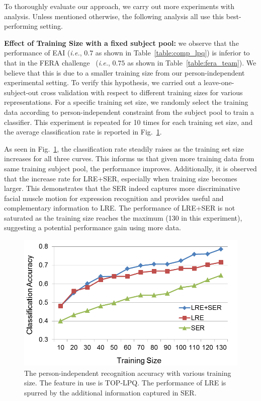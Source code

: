 \documentclass[journal]{IEEEtran}
\begin{document}
To thoroughly evaluate our approach, we carry out more experiments with analysis. Unless mentioned otherwise, the following analysis all use this best-performing setting. 

\textbf{Effect of Training Size with a fixed subject pool:} we observe that the performance of EAI (\textit{i.e.}, $0.7$ as shown in Table~\ref{table:comp_lpq}) is inferior to that in the FERA challenge~\cite{Yang_SMCB12} (\textit{i.e.}, $0.75$ as shown in Table~\ref{table:fera_team}). We believe that this is due to a smaller training size from our person-independent experimental setting. To verify this hypothesis, we carried out a leave-one-subject-out cross validation with respect to different training sizes for various representations. For a specific training set size, we randomly select the training data according to person-independent constraint from the subject pool to train a classifier. This experiment is repeated for 10 times for each training set size, and the average classification rate is reported in Fig.~\ref{fig:effect_training_size}. 

As seen in Fig.~\ref{fig:effect_training_size}, the classification rate steadily raises as the training set size increases for all three curves. This informs us that given more training data from same training subject pool, the performance improves. Additionally, it is observed that the increase rate for LRE+SER, especially when training size becomes larger. This demonstrates that the SER indeed captures more discriminative facial muscle motion for expression recognition and provides useful and complementary information to LRE. The performance of LRE+SER is not saturated as the training size reaches the maximum (130 in this experiment), suggesting a potential performance gain using more data.


\begin{figure}[htbp]
	\centering
		\includegraphics[width=.8\columnwidth]{pics/effect_training_size.png}
	\caption{The person-independent recognition accuracy with various training size. The feature in use is TOP-LPQ. The performance of LRE is spurred by the additional information captured in SER.}
	\label{fig:effect_training_size}
\end{figure}
\end{document}
